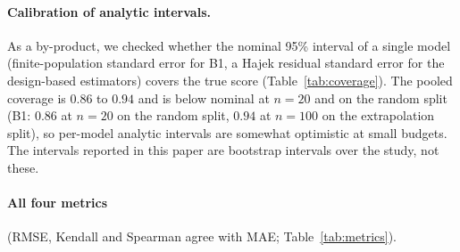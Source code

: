 \paragraph{Calibration of analytic intervals.}
As a by-product, we checked whether the nominal 95\% interval of a single model (finite-population standard error for B1, a Hajek residual standard error for the design-based estimators) covers the true score (Table~\ref{tab:coverage}). The pooled coverage is $0.86$ to $0.94$ and is below nominal at $n{=}20$ and on the random split (B1: $0.86$ at $n{=}20$ on the random split, $0.94$ at $n{=}100$ on the extrapolation split), so per-model analytic intervals are somewhat optimistic at small budgets. The intervals reported in this paper are bootstrap intervals over the study, not these.

\paragraph{All four metrics} (RMSE, Kendall and Spearman agree with MAE; Table~\ref{tab:metrics}).
\begin{table}[h]
\caption{Difference to B1 at $n{=}50$ in MAE, RMSE, Spearman and Kendall (macro-average over 13 benchmarks, 95\% two-level bootstrap intervals over repetitions and target models). Kendall's $\tau$ was bootstrapped over targets for seven methods only (dashes: not computed). Values from \texttt{results/tables/review/target\_bootstrap\_macro.csv}.}
\label{tab:metrics}\centering\resizebox{\linewidth}{!}{}
\end{table}

